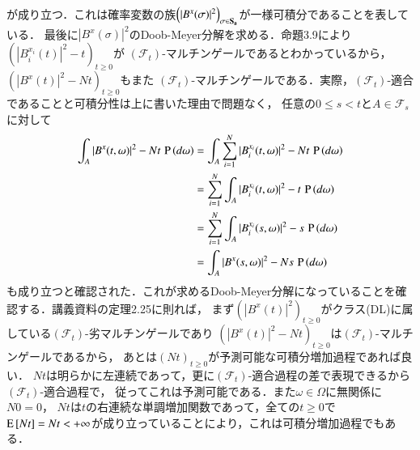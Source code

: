 \begin{prf}
\begin{description}
\begin{align}
		\end{align}
		が成り立つ．これは確率変数の族$\left(|B^x(\sigma)|^2\right)_{\sigma \in \bf{S}_a}$が一様可積分であることを表している．
		最後に$|B^x(\sigma)|^2$のDoob-Meyer分解を求める．命題3.9により$\left(|B_i^{x_i}(t)|^2 - t\right)_{t \geq 0}$が
		$(\mathcal{F}_t)$-マルチンゲールであるとわかっているから，$\left(|B^x(t)|^2 - Nt\right)_{t \geq 0}$もまた
		$(\mathcal{F}_t)$-マルチンゲールである．実際，$(\mathcal{F}_t)$-適合であることと可積分性は上に書いた理由で問題なく，
		任意の$0 \leq s < t$と$A \in \mathcal{F}_s$に対して
		\begin{align}
			\int_{A} |B^x(t, \omega)|^2 - Nt\, \operatorname{P} \left(d\omega\right) 
			&= \int_{A} \sum_{i=1}^{N} |B_i^{x_i}(t,\omega)|^2 - Nt\, \operatorname{P} \left(d\omega\right) \\
			&= \sum_{i=1}^{N} \int_{A} |B_i^{x_i}(t,\omega)|^2 - t\, \operatorname{P} \left(d\omega\right) \\
			&= \sum_{i=1}^{N} \int_{A} |B_i^{x_i}(s,\omega)|^2 - s\, \operatorname{P} \left(d\omega\right) \\
			&= \int_{A} |B^x(s, \omega)|^2 - Ns\, \operatorname{P} \left(d\omega\right) 
		\end{align}
		も成り立つと確認された．これが求めるDoob-Meyer分解になっていることを確認する．講義資料の定理2.25に則れば，
		まず$\left(|B^x(t)|^2\right)_{t \geq 0}$がクラス(DL)に属している$(\mathcal{F}_t)$-劣マルチンゲールであり
		$\left(|B^x(t)|^2 - Nt\right)_{t \geq 0}$は$(\mathcal{F}_t)$-マルチンゲールであるから，
		あとは$(Nt)_{t \geq 0}$が予測可能な可積分増加過程であれば良い．
		$Nt$は明らかに左連続であって，更に$(\mathcal{F}_t)$-適合過程の差で表現できるから$(\mathcal{F}_t)$-適合過程で，
		従ってこれは予測可能である．また$\omega \in \Omega$に無関係に$N 0 = 0$，
		$Nt$は$t$の右連続な単調増加関数であって，全ての$t \geq 0$で$\operatorname{E} \left[ Nt \right] = Nt < +\infty$が成り立っていることにより，これは可積分増加過程でもある．
		\QED
	

\end{description}
\end{prf}
